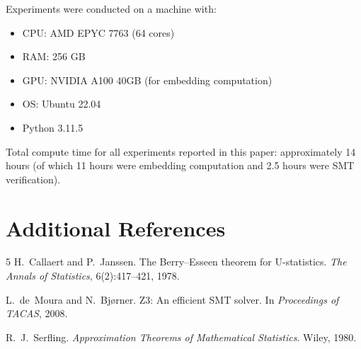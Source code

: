 \documentclass[11pt,a4paper]{article}
\begin{document}
Experiments were conducted on a machine with:
\begin{itemize}[leftmargin=2em,itemsep=1pt]
\item CPU: AMD EPYC 7763 (64 cores)
\item RAM: 256 GB
\item GPU: NVIDIA A100 40GB (for embedding computation)
\item OS: Ubuntu 22.04
\item Python 3.11.5
\end{itemize}

Total compute time for all experiments reported in
this paper: approximately 14 hours (of which 11 hours
were embedding computation and 2.5 hours were SMT
verification).

\section*{Additional References}

\begin{thebibliography}{5}
H.~Callaert and P.~Janssen.
\newblock The {B}erry--{E}sseen theorem for {U}-statistics.
\newblock \emph{The Annals of Statistics}, 6(2):417--421, 1978.

L.~de~Moura and N.~Bj{\o}rner.
\newblock Z3: An efficient {SMT} solver.
\newblock In \emph{Proceedings of TACAS}, 2008.

R.~J.~Serfling.
\newblock \emph{Approximation Theorems of Mathematical Statistics}.
\newblock Wiley, 1980.
\end{thebibliography}
\end{document}
